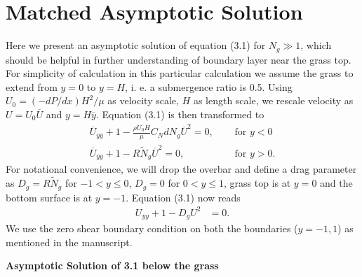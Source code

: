 \documentclass[12pt]{report}   %
\newcommand{\Ndg}{\tilde{N}_g}
\renewcommand{\bar}{\overline}
\begin{document}
\chapter{Matched Asymptotic Solution}
Here we present an asymptotic solution of equation (3.1) for $N_g \gg 1$, which should be helpful in further understanding of boundary layer near the grass top. For simplicity of calculation in this particular calculation we assume the grass to extend from $y=0$ to $y=H$, i. e. a submergence ratio is 0.5. 
Using $ U_0 = (-dP/dx)H^2/\mu$ as velocity scale, $H$ as length scale, we rescale velocity as $U= U_0 \bar{U}$ and $y = H \bar{y}$. Equation (3.1) is then transformed to  
\begin{equation}
\begin{split}
 \bar{U}_{\bar{y}\bar{y}}+1 - \frac{\rho U_0 H}{\mu} C_N d N_g \bar{U}^2 =0, \quad &\text{ for } y<0\\
 \bar{U}_{\bar{y}\bar{y}}+1 - R \Ndg \bar{U}^2=0, \quad &\text{ for } y>0.
\end{split}
\end{equation}
For notational convenience, we will drop the overbar and define a drag parameter as $D_g = R\Ndg$ for $-1<y\le 0$, $D_g = 0$ for $0<y\le 1$, grass top is at $y=0$ and the bottom surface is at $y=-1$. Equation (3.1) now reads
\begin{equation}
\begin{split}
 {U}_{{y}{y}}+1 - D_g{U}^2 &=0.
\end{split}
\end{equation}
We use the zero shear boundary condition on both the boundaries ($y=-1,1$) as mentioned in the manuscript.

\vspace{2mm}
\noindent
\textbf{Asymptotic Solution of 3.1 below the grass}
\end{document}
